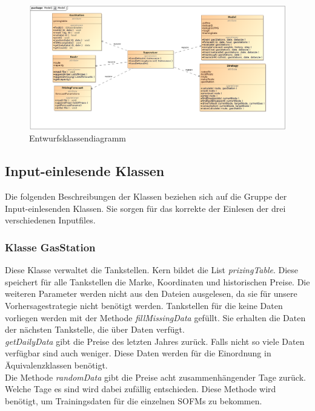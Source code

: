 \documentclass[11pt]{article}
\begin{document}
	\begin{figure}[ht]
		\centering
		\includegraphics[width=\textwidth]{Model.png}
		\caption{Entwurfsklassendiagramm}
		\label{design}
	\end{figure}
\subsection{Input-einlesende Klassen}
	Die folgenden Beschreibungen der Klassen beziehen sich auf die Gruppe der Input-einlesenden Klassen. Sie sorgen für das korrekte der Einlesen der drei verschiedenen Inputfiles.
\subsubsection{Klasse GasStation}
	Diese Klasse verwaltet die Tankstellen. Kern bildet die List \textit{prizingTable}. Diese speichert für alle Tankstellen die Marke, Koordinaten und historischen Preise. Die weiteren Parameter werden nicht aus den Dateien ausgelesen, da sie für unsere Vorhersagestrategie nicht benötigt werden. Tankstellen für die keine Daten vorliegen werden mit der Methode \textit{fillMissingData} gefüllt. Sie erhalten die Daten der nächsten Tankstelle, die über Daten verfügt.\\
	\textit{getDailyData} gibt die Preise des letzten Jahres zurück. Falls nicht so viele Daten verfügbar sind auch weniger. Diese Daten werden für die Einordnung in Äquivalenzklassen benötigt.\\
	Die Methode \textit{randomData} gibt die Preise acht zusammenhängender Tage zurück. Welche Tage es sind wird dabei zufällig entschieden. Diese Methode wird benötigt, um Trainingsdaten für die einzelnen SOFMs zu bekommen.
\end{document}
